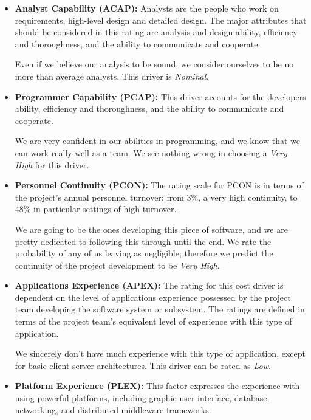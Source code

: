 \documentclass[english]{article}
\begin{document}
\begin{itemize}
\item \textbf{Analyst Capability (ACAP):} Analysts are the people who work on requirements, high-level design and detailed design. The major attributes that should be considered in this rating are analysis and design ability, efficiency and thoroughness, and the ability to communicate and cooperate.

Even if we believe our analysis to be sound, we consider ourselves to be no more than average analysts. This driver is \textit{Nominal}.

\item \textbf{Programmer Capability (PCAP):} This driver accounts for the developers ability, efficiency and thoroughness, and the ability to communicate and cooperate.

We are very confident in our abilities in programming, and we know that we can work really well as a team. We see nothing wrong in choosing a \textit{Very High} for this driver.


\item \textbf{Personnel Continuity (PCON):} The rating scale for PCON is in terms of the project’s annual personnel turnover: from
3\%, a very high continuity, to 48\% in particular settings of high turnover.

We are going to be the ones developing this piece of software, and we are pretty dedicated to following this through until the end. We rate the probability of any of us leaving as negligible; therefore we predict the continuity of the project development to be \textit{Very High}.


\item \textbf{Applications Experience (APEX):} The rating for this cost driver is dependent on the level of applications experience possessed by the project team developing the software system or subsystem. The ratings are defined in terms of the project team’s equivalent level of experience with this type of application.

We sincerely don't have much experience with this type of application, except for basic client-server architectures. This driver can be rated as \textit{Low}.


\item \textbf{Platform Experience (PLEX):} This factor expresses the experience with using powerful platforms, including graphic user interface, database, networking, and distributed middleware frameworks.


\end{itemize}
\end{document}
